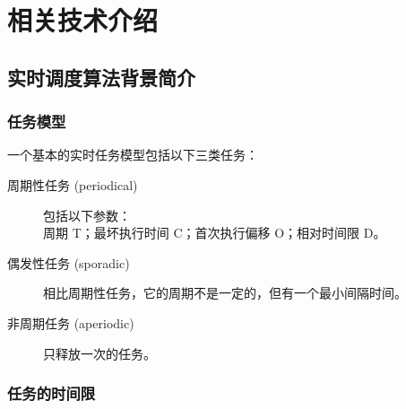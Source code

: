 ﻿%




\chapter{相关技术介绍}

\section{实时调度算法背景简介}



\subsection{任务模型}

一个基本的实时任务模型包括以下三类任务：
\begin{description}
  \item[周期性任务 (periodical)] 包括以下参数：\\
    周期 T；最坏执行时间 C；首次执行偏移 O；相对时间限 D。
  \item[偶发性任务 (sporadic)] 相比周期性任务，它的周期不是一定的，但有一个最小间隔时间。
  \item[非周期任务 (aperiodic)] 只释放一次的任务。
\end{description}

\subsection{任务的时间限}

